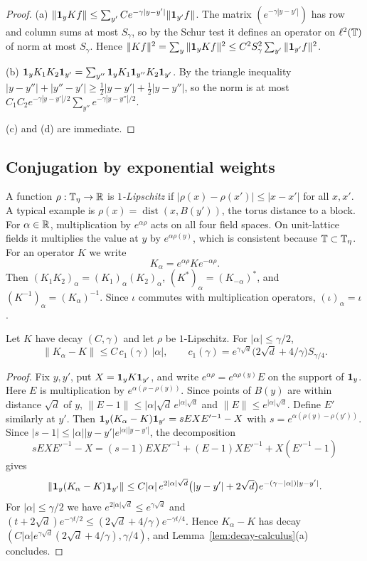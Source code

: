 \begin{proof}
(a) $\|\mathbf 1_yKf\|\le\sum_{y'}Ce^{-\gamma|y-y'|}\|\mathbf 1_{y'}f\|$. The matrix $(e^{-\gamma|y-y'|})$ has row and column sums at most $S_\gamma$, so by the Schur test it defines an operator on $\ell^2(\mathbb T)$ of norm at most $S_\gamma$. Hence $\|Kf\|^2=\sum_y\|\mathbf 1_yKf\|^2\le C^2S_\gamma^2\sum_{y'}\|\mathbf 1_{y'}f\|^2$.

(b) $\mathbf 1_yK_1K_2\mathbf 1_{y'}=\sum_{y''}\mathbf 1_yK_1\mathbf 1_{y''}K_2\mathbf 1_{y'}$. By the triangle inequality $|y-y''|+|y''-y'|\ge\frac12|y-y'|+\frac12|y-y''|$, so the norm is at most $C_1C_2e^{-\gamma|y-y'|/2}\sum_{y''}e^{-\gamma|y-y''|/2}$.

(c) and (d) are immediate.
\end{proof}

\subsection{Conjugation by exponential weights}

A function $\rho:\mathbb T_\eta\to\mathbb R$ is \emph{$1$-Lipschitz} if $|\rho(x)-\rho(x')|\le|x-x'|$ for all $x,x'$. A typical example is $\rho(x)=\operatorname{dist}(x,B(y'))$, the torus distance to a block. For $\alpha\in\mathbb R$, multiplication by $e^{\alpha\rho}$ acts on all four field spaces. On unit-lattice fields it multiplies the value at $y$ by $e^{\alpha\rho(y)}$, which is consistent because $\mathbb T\subset\mathbb T_\eta$. For an operator $K$ we write
\[
K_\alpha=e^{\alpha\rho}Ke^{-\alpha\rho}.
\]
Then $(K_1K_2)_\alpha=(K_1)_\alpha(K_2)_\alpha$, $(K^*)_\alpha=(K_{-\alpha})^*$, and $(K^{-1})_\alpha=(K_\alpha)^{-1}$. Since $\iota$ commutes with multiplication operators, $(\iota)_\alpha=\iota$.

\begin{lemma}\label{lem:conjugation}
Let $K$ have decay $(C,\gamma)$ and let $\rho$ be $1$-Lipschitz. For $|\alpha|\le\gamma/2$,
\[
\|K_\alpha-K\|\le C\,c_1(\gamma)\,|\alpha|,\qquad c_1(\gamma)=e^{\gamma\sqrt d}\big(2\sqrt d+4/\gamma\big)S_{\gamma/4}.
\]
\end{lemma}

\begin{proof}
Fix $y,y'$, put $X=\mathbf 1_yK\mathbf 1_{y'}$, and write $e^{\alpha\rho}=e^{\alpha\rho(y)}E$ on the support of $\mathbf 1_y$. Here $E$ is multiplication by $e^{\alpha(\rho-\rho(y))}$. Since points of $B(y)$ are within distance $\sqrt d$ of $y$, $\|E-1\|\le|\alpha|\sqrt d\,e^{|\alpha|\sqrt d}$ and $\|E\|\le e^{|\alpha|\sqrt d}$. Define $E'$ similarly at $y'$. Then $\mathbf 1_y(K_\alpha-K)\mathbf 1_{y'}=sEXE'^{-1}-X$ with $s=e^{\alpha(\rho(y)-\rho(y'))}$. Since $|s-1|\le|\alpha||y-y'|e^{|\alpha||y-y'|}$, the decomposition
\[
sEXE'^{-1}-X=(s-1)EXE'^{-1}+(E-1)XE'^{-1}+X(E'^{-1}-1)
\]
gives
\[
\|\mathbf 1_y(K_\alpha-K)\mathbf 1_{y'}\|\le C|\alpha|\,e^{2|\alpha|\sqrt d}\big(|y-y'|+2\sqrt d\big)e^{-(\gamma-|\alpha|)|y-y'|}.
\]
For $|\alpha|\le\gamma/2$ we have $e^{2|\alpha|\sqrt d}\le e^{\gamma\sqrt d}$ and $(t+2\sqrt d)e^{-\gamma t/2}\le(2\sqrt d+4/\gamma)e^{-\gamma t/4}$. Hence $K_\alpha-K$ has decay $(C|\alpha|e^{\gamma\sqrt d}(2\sqrt d+4/\gamma),\gamma/4)$, and Lemma~\ref{lem:decay-calculus}(a) concludes.
\end{proof}

